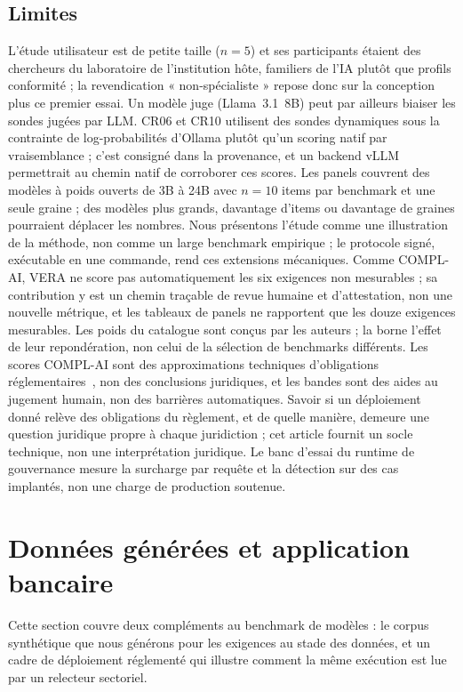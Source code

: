 \documentclass[10pt,conference]{IEEEtran}
\begin{document}
\subsection{Limites}
L'étude utilisateur est de petite taille ($n{=}5$) et ses participants étaient des chercheurs du laboratoire de l'institution hôte, familiers de l'IA plutôt que profils conformité ; la revendication « non-spécialiste » repose donc sur la conception plus ce premier essai. Un modèle juge (Llama~3.1~8B) peut par ailleurs biaiser les sondes jugées par LLM.
CR06 et CR10 utilisent des sondes dynamiques sous la contrainte de log-probabilités d'Ollama plutôt qu'un scoring natif par vraisemblance ; c'est consigné dans la provenance, et un backend vLLM permettrait au chemin natif de corroborer ces scores.
Les panels couvrent des modèles à poids ouverts de 3B à 24B avec $n{=}10$ items par benchmark et une seule graine ; des modèles plus grands, davantage d'items ou davantage de graines pourraient déplacer les nombres.
Nous présentons l'étude comme une illustration de la méthode, non comme un large benchmark empirique ; le protocole signé, exécutable en une commande, rend ces extensions mécaniques.
Comme COMPL-AI, VERA ne score pas automatiquement les six exigences non mesurables ; sa contribution y est un chemin traçable de revue humaine et d'attestation, non une nouvelle métrique, et les tableaux de panels ne rapportent que les douze exigences mesurables.
Les poids du catalogue sont conçus par les auteurs ; la  borne l'effet de leur repondération, non celui de la sélection de benchmarks différents.
Les scores COMPL-AI sont des approximations techniques d'obligations réglementaires~\cite{guldimann2024complai,euaiact2024}, non des conclusions juridiques, et les bandes sont des aides au jugement humain, non des barrières automatiques.
Savoir si un déploiement donné relève des obligations du règlement, et de quelle manière, demeure une question juridique propre à chaque juridiction ; cet article fournit un socle technique, non une interprétation juridique.
Le banc d'essai du runtime de gouvernance mesure la surcharge par requête et la détection sur des cas implantés, non une charge de production soutenue.

\section{Données générées et application bancaire}
\label{sec:application}
Cette section couvre deux compléments au benchmark de modèles : le corpus synthétique que nous générons pour les exigences au stade des données, et un cadre de déploiement réglementé qui illustre comment la même exécution est lue par un relecteur sectoriel.
\end{document}
